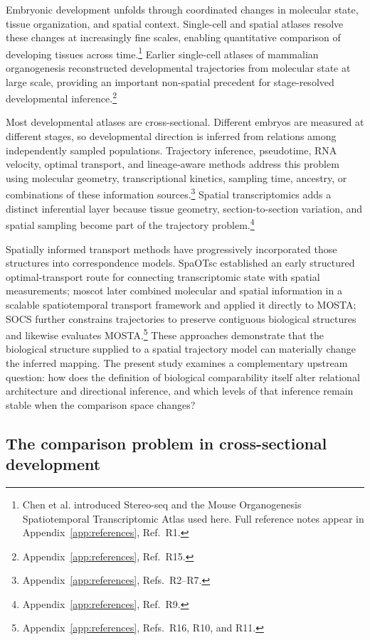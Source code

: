 \documentclass[11pt]{article}
\begin{document}
Embryonic development unfolds through coordinated changes in molecular state, tissue organization, and spatial context. Single-cell and spatial atlases resolve these changes at increasingly fine scales, enabling quantitative comparison of developing tissues across time.\footnote{Chen et al. introduced Stereo-seq and the Mouse Organogenesis Spatiotemporal Transcriptomic Atlas used here. Full reference notes appear in Appendix~\ref{app:references}, Ref.~R1.} Earlier single-cell atlases of mammalian organogenesis reconstructed developmental trajectories from molecular state at large scale, providing an important non-spatial precedent for stage-resolved developmental inference.\footnote{Appendix~\ref{app:references}, Ref.~R15.}

Most developmental atlases are cross-sectional. Different embryos are measured at different stages, so developmental direction is inferred from relations among independently sampled populations. Trajectory inference, pseudotime, RNA velocity, optimal transport, and lineage-aware methods address this problem using molecular geometry, transcriptional kinetics, sampling time, ancestry, or combinations of these information sources.\footnote{Appendix~\ref{app:references}, Refs.~R2--R7.} Spatial transcriptomics adds a distinct inferential layer because tissue geometry, section-to-section variation, and spatial sampling become part of the trajectory problem.\footnote{Appendix~\ref{app:references}, Ref.~R9.}

Spatially informed transport methods have progressively incorporated those structures into correspondence models. SpaOTsc established an early structured optimal-transport route for connecting transcriptomic state with spatial measurements; moscot later combined molecular and spatial information in a scalable spatiotemporal transport framework and applied it directly to MOSTA; SOCS further constrains trajectories to preserve contiguous biological structures and likewise evaluates MOSTA.\footnote{Appendix~\ref{app:references}, Refs.~R16, R10, and R11.} These approaches demonstrate that the biological structure supplied to a spatial trajectory model can materially change the inferred mapping. The present study examines a complementary upstream question: how does the definition of biological comparability itself alter relational architecture and directional inference, and which levels of that inference remain stable when the comparison space changes?

\subsection{The comparison problem in cross-sectional development}
\end{document}
